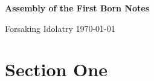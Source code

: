 \documentclass[12pt]{article}
\begin{document}
	\noindent
	\textbf{Assembly of the First Born \hfill Notes}

	\noindent
	Forsaking Idolatry \hfill \today
	
	\begin{center}
		\BibleFirstJohnFiveTwentyOne{}
	\end{center}

	\section*{\normalsize Section One}
\end{document}
